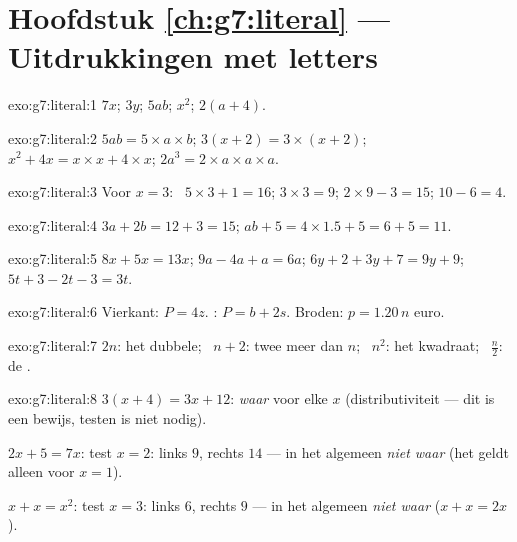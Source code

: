 \section*{Hoofdstuk \ref{ch:g7:literal} --- Uitdrukkingen met letters}

\begin{solution}{exo:g7:literal:1}
$7x$; \quad $3y$; \quad $5ab$; \quad $x^2$; \quad $2(a + 4)$.
\end{solution}

\begin{solution}{exo:g7:literal:2}
$5ab = 5 \times a \times b$; \quad
$3(x+2) = 3 \times (x + 2)$; \quad
$x^2 + 4x = x \times x + 4 \times x$; \quad
$2a^3 = 2 \times a \times a \times a$.
\end{solution}

\begin{solution}{exo:g7:literal:3}
Voor $x = 3$: \ $5 \times 3 + 1 = 16$; \quad $3 \times 3 = 9$; \quad
$2 \times 9 - 3 = 15$; \quad $10 - 6 = 4$.
\end{solution}

\begin{solution}{exo:g7:literal:4}
$3a + 2b = 12 + 3 = 15$; \qquad
$ab + 5 = 4 \times 1.5 + 5 = 6 + 5 = 11$.
\end{solution}

\begin{solution}{exo:g7:literal:5}
$8x + 5x = 13x$; \quad
$9a - 4a + a = 6a$; \quad
$6y + 2 + 3y + 7 = 9y + 9$; \quad
$5t + 3 - 2t - 3 = 3t$.
\end{solution}

\begin{solution}{exo:g7:literal:6}
Vierkant: $P = 4z$. : $P = b + 2s$. Broden:
$p = 1.20\,n$ euro.
\end{solution}

\begin{solution}{exo:g7:literal:7}
$2n$: het dubbele; \ $n + 2$: twee meer dan $n$; \ $n^2$: het kwadraat;
\ $\frac n2$: de .
\end{solution}

\begin{solution}{exo:g7:literal:8}
$3(x+4) = 3x + 12$: \emph{waar} voor elke $x$ (distributiviteit --- dit is een
bewijs, testen is niet nodig).

$2x + 5 = 7x$: test $x = 2$: links $9$, rechts $14$ --- in het algemeen
\emph{niet waar} (het geldt alleen voor $x = 1$).

$x + x = x^2$: test $x = 3$: links $6$, rechts $9$ --- in het algemeen
\emph{niet waar} ($x + x = 2x$).
\end{solution}

